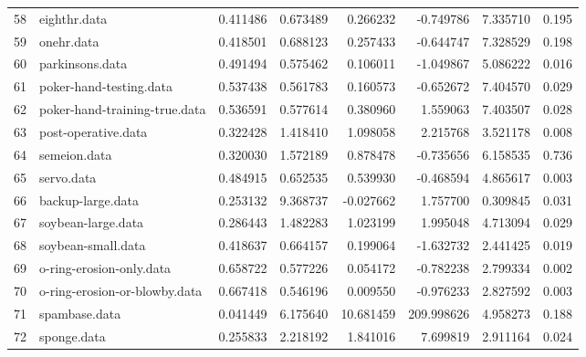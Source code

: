 \begin{table}
{\begin{tabular}{|l|l|rrrrrr|}
58 &                             eighthr.data &       0.411486 &               0.673489 &   0.266232 &   -0.749786 &  7.335710 &        0.195 \\
59 &                               onehr.data &       0.418501 &               0.688123 &   0.257433 &   -0.644747 &  7.328529 &        0.198 \\
60 &                          parkinsons.data &       0.491494 &               0.575462 &   0.106011 &   -1.049867 &  5.086222 &        0.016 \\
61 &                  poker-hand-testing.data &       0.537438 &               0.561783 &   0.160573 &   -0.652672 &  7.404570 &        0.029 \\
62 &            poker-hand-training-true.data &       0.536591 &               0.577614 &   0.380960 &    1.559063 &  7.403507 &        0.028 \\
63 &                      post-operative.data &       0.322428 &               1.418410 &   1.098058 &    2.215768 &  3.521178 &        0.008 \\
64 &                             semeion.data &       0.320030 &               1.572189 &   0.878478 &   -0.735656 &  6.158535 &        0.736 \\
65 &                               servo.data &       0.484915 &               0.652535 &   0.539930 &   -0.468594 &  4.865617 &        0.003 \\
66 &                        backup-large.data &       0.253132 &               9.368737 &  -0.027662 &    1.757700 &  0.309845 &        0.031 \\
67 &                       soybean-large.data &       0.286443 &               1.482283 &   1.023199 &    1.995048 &  4.713094 &        0.029 \\
68 &                       soybean-small.data &       0.418637 &               0.664157 &   0.199064 &   -1.632732 &  2.441425 &        0.019 \\
69 &                 o-ring-erosion-only.data &       0.658722 &               0.577226 &   0.054172 &   -0.782238 &  2.799334 &        0.002 \\
70 &            o-ring-erosion-or-blowby.data &       0.667418 &               0.546196 &   0.009550 &   -0.976233 &  2.827592 &        0.003 \\
71 &                            spambase.data &       0.041449 &               6.175640 &  10.681459 &  209.998626 &  4.958273 &        0.188 \\
72 &                              sponge.data &       0.255833 &               2.218192 &   1.841016 &    7.699819 &  2.911164 &        0.024 \\

\end{tabular}}
\end{table}
